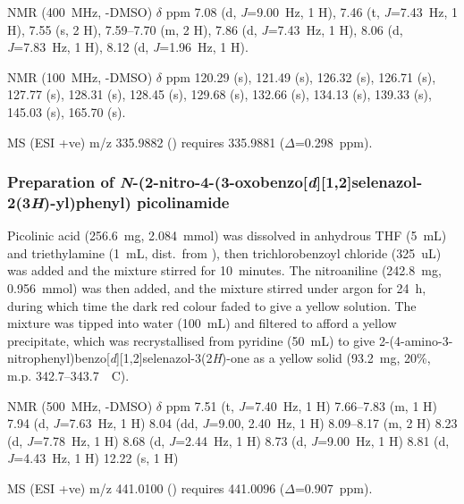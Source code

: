 \begin{refsection}
 NMR (400~MHz, -DMSO) $\delta$ ppm
7.08 (d, \emph{J}=9.00~Hz, 1 H),
7.46 (t, \emph{J}=7.43~Hz, 1 H),
7.55 (s, 2 H),
7.59--7.70 (m, 2 H),
7.86 (d, \emph{J}=7.43~Hz, 1 H),
8.06 (d, \emph{J}=7.83~Hz, 1 H),
8.12 (d, \emph{J}=1.96~Hz, 1 H).

 NMR (100~MHz, -DMSO) $\delta$ ppm
120.29 (s),
121.49 (s),
126.32 (s),
126.71 (s),
127.77 (s),
128.31 (s),
128.45 (s),
129.68 (s),
132.66 (s),
134.13 (s),
139.33 (s),
145.03 (s),
165.70 (s).

MS (ESI +ve) m/z 335.9882 ()  requires 335.9881 ($\Delta$=0.298~ppm).

\subsubsection[Preparation of \refcmpd{ebs-nitroamide-2py}]{Preparation of \emph{N}-(2-nitro-4-(3-oxobenzo[\emph{d}][1,2]selenazol-2(3\emph{H})-yl)\-phenyl) picolinamide }
Picolinic acid (256.6~mg, 2.084~mmol) was dissolved in anhydrous THF (5~mL) and triethylamine (1~mL, dist.\ from ), then trichlorobenzoyl chloride (325~uL) was added and the mixture stirred for 10~minutes.
The nitroaniline  (242.8~mg, 0.956~mmol) was then added, and the mixture stirred under argon for 24~h, during which time the dark red colour faded to give a yellow solution.
The mixture was tipped into water (100~mL) and filtered to afford a yellow precipitate, which was recrystallised from pyridine (50~mL) to give 2-(4-amino-3-nitrophenyl)benzo[\emph{d}][1,2]\-selen\-azol-3(2\emph{H})-one  as a yellow solid (93.2~mg, 20\%, m.p. 342.7--343.7~\degree~C).

 NMR (500~MHz, -DMSO) $\delta$ ppm
7.51 (t, \emph{J}=7.40~Hz, 1 H)
7.66--7.83 (m, 1 H)
7.94 (d, \emph{J}=7.63~Hz, 1 H)
8.04 (dd, \emph{J}=9.00, 2.40~Hz, 1 H)
8.09--8.17 (m, 2 H)
8.23 (d, \emph{J}=7.78~Hz, 1 H)
8.68 (d, \emph{J}=2.44~Hz, 1 H)
8.73 (d, \emph{J}=9.00~Hz, 1 H)
8.81 (d, \emph{J}=4.43~Hz, 1 H)
12.22 (s, 1 H)

MS (ESI +ve) m/z 441.0100 ()  requires 441.0096 ($\Delta$=0.907~ppm).

\end{refsection}
